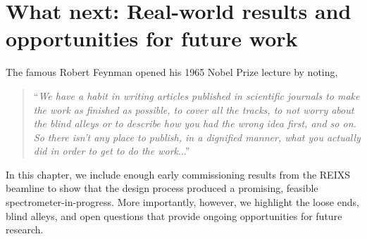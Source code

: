 \chapter{What next: Real-world results and opportunities for future work}
The famous Robert Feynman opened his 1965 Nobel Prize lecture by noting,
\begin{quote}
``\emph{We have a habit in writing articles published in scientific journals to make the work as finished as possible, to cover all the tracks, to not worry about the blind alleys or to describe how you had the wrong idea first, and so on. So there isn't any place to publish, in a dignified manner, what you actually did in order to get to do the work}...'' \cite{fey65}
\end{quote}
In this chapter, we include enough early commissioning results from the REIXS beamline to show that the design process produced a promising, feasible spectrometer-in-progress.  More importantly, however, we highlight the loose ends, blind alleys, and open questions that provide ongoing opportunities for future research.

